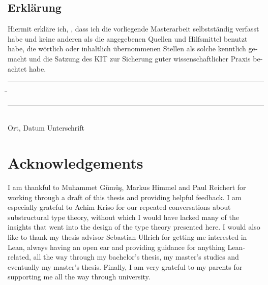 \documentclass[parskip=no,12pt,a4paper,twoside,headings=openright, fleqn]{scrreprt}
\begin{document}



\begin{otherlanguage}{ngerman}
\chapter*{Erklärung}
\pagestyle{empty}

  \vspace{20mm}
  Hiermit erkläre ich, \theauthor, dass ich die vorliegende Masterarbeit selbst\-ständig
verfasst habe und keine anderen als die angegebenen Quellen und Hilfsmittel
benutzt habe, die wörtlich oder inhaltlich übernommenen Stellen als solche kenntlich gemacht und
die Satzung des KIT zur Sicherung guter wissenschaftlicher Praxis beachtet habe.
  \vspace{20mm}
  \begin{tabbing}
  \rule{7cm}{.4pt}\hspace{1cm} \= \rule{6.8cm}{.4pt} \\
 Ort, Datum \> Unterschrift
  \end{tabbing}
\end{otherlanguage}

\chapter*{Acknowledgements}
\thispagestyle{balloon}
I am thankful to Muhammet Gümüş, Markus Himmel and Paul Reichert for working through a draft of this thesis and providing helpful feedback. I am especially grateful to Achim Kriso for our repeated conversations about substructural type theory, without which I would have lacked many of the insights that went into the design of the type theory presented here. I would also like to thank my thesis advisor Sebastian Ullrich for getting me interested in Lean, always having an open ear and providing guidance for anything Lean-related, all the way through my bachelor's thesis, my master's studies and eventually my master's thesis. Finally, I am very grateful to my parents for supporting me all the way through university.
\pagestyle{empty}
\end{document}
